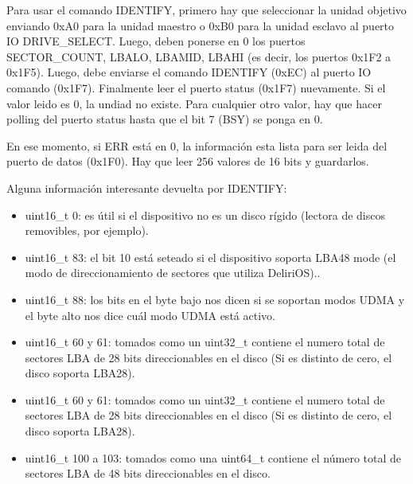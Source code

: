 Para usar el comando IDENTIFY, primero hay que seleccionar la unidad objetivo enviando 0xA0 para la unidad maestro o 0xB0  para la unidad esclavo al puerto IO DRIVE\_SELECT. Luego, deben ponerse en 0 los puertos SECTOR\_COUNT, LBALO, LBAMID, LBAHI (es decir, los puertos 0x1F2 a 0x1F5). Luego, debe enviarse el comando IDENTIFY (0xEC) al puerto IO comando (0x1F7). Finalmente leer el puerto status (0x1F7) nuevamente. Si el valor leido es 0, la undiad no existe. Para cualquier otro valor, hay que hacer polling del puerto status hasta que el bit 7 (BSY) se ponga en 0.

En ese momento, si ERR está en 0, la información esta lista para ser leida del puerto de datos (0x1F0). Hay que leer 256 valores de 16 bits y guardarlos.

Alguna información interesante devuelta por IDENTIFY:

\begin{itemize}
 \item uint16\_t 0: es útil si el dispositivo no es un disco rígido (lectora de discos removibles, por ejemplo).
 \item uint16\_t 83: el bit 10 está seteado si el dispositivo soporta LBA48 mode (el modo de direccionamiento de sectores que utiliza DeliriOS)..
 \item uint16\_t 88: los bits en el byte bajo nos dicen si se soportan modos UDMA y el byte alto nos dice cuál modo UDMA está activo. 
 \item uint16\_t 60 y 61: tomados como un uint32\_t contiene el numero total de  sectores LBA de 28 bits direccionables en el disco (Si es distinto de cero, el disco soporta LBA28).
 \item uint16\_t 60 y 61: tomados como un uint32\_t contiene el numero total de  sectores LBA de 28 bits direccionables en el disco (Si es distinto de cero, el disco soporta LBA28).
 \item uint16\_t 100 a 103: tomados como una uint64\_t contiene el número total de sectores LBA de 48 bits direccionables en el disco.
\end{itemize}






